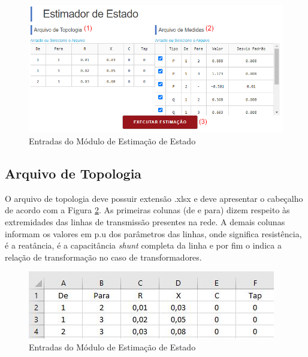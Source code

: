 \documentclass{article}
\begin{document}
\begin{figure}[H]
    \centering
    \includegraphics[scale=.45]{Imagens/Entradas_Estimação_de_Estado.png}
    \caption{Entradas do Módulo de Estimação de Estado}
    \label{fig:entrada_estimação}
\end{figure}

\subsection{Arquivo de Topologia}
O arquivo de topologia deve possuir extensão .xlsx e deve apresentar o cabeçalho de acordo com a Figura \ref{fig:arq_top}. As primeiras colunas (de e para) dizem respeito às extremidades das linhas de transmissão presentes na rede. A demais colunas informam os valores em p.u dos parâmetros das linhas, onde  significa resistência,  é a reatância,  é a capacitância \textit{shunt} completa da linha e por fim o  indica a relação de transformação no caso de transformadores.
\begin{figure}[H]
    \centering
    \includegraphics[scale=.7]{Imagens/Foto_Arquivo de_Topologia.JPG}
    \caption{Entradas do Módulo de Estimação de Estado}
    \label{fig:arq_top}
\end{figure}
\end{document}
